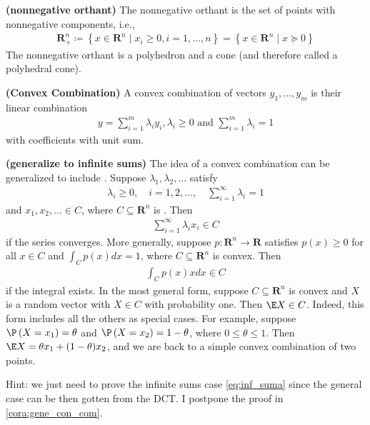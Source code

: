\documentclass{article}
\newcommand{\bfs}[1]{\textbf{({#1}) }}
\begin{document}
\begin{exma}{\bfs{nonnegative orthant}}\label{exma:orthnat}
The nonnegative orthant is the set of points with nonnegative components, i.e.,
\begin{align*}
\mathbf{R}_{+}^{n}\coloneqq\left\{x \in \mathbf{R}^{n} \mid x_{i} \geq 0, i=1, \ldots, n\right\}=\left\{x \in \mathbf{R}^{n} \mid x \succeq 0\right\}
\end{align*}
The nonnegative orthant is a polyhedron and a cone (and therefore called a polyhedral cone).
\end{exma}

\begin{defa}{\bfs{Convex Combination}}\label{def:con_com}
 A convex combination of  vectors $y_{1}, \ldots, y_{m}$ is their linear combination
\begin{align*}
y=\sum_{i=1}^{m} \lambda_{i} y_{i}, \lambda_{i} \geq 0 \text{ and } \sum_{i=1}^{m} \lambda_{i}=1
\end{align*}
with  coefficients with unit sum.
\end{defa}
\begin{rema}{\bfs{generalize to infinite sums}}\label{rema:gene_con_com}
The idea of a convex combination can be generalized to include . Suppose $\lambda_{1}, \lambda_{2}, \ldots$ satisfy
\begin{align*}
\lambda_{i} \geq 0, \quad i=1,2, \ldots, \quad \sum_{i=1}^{\infty} \lambda_{i}=1
\end{align*}
and $x_{1}, x_{2}, \ldots \in C$, where $C \subseteq \mathbf{R}^{n}$ is . Then
\begin{align}
\sum_{i=1}^{\infty} \lambda_{i} x_{i} \in C \label{eq:inf_suma}
\end{align}
if the series converges. More generally, suppose $p: \mathbf{R}^{n} \rightarrow \mathbf{R}$ satisfies $p(x) \geq 0$ for all $x \in C$ and $\int_{C} p(x) d x=1$, where $C \subseteq \mathbf{R}^{n}$ is convex. Then
\begin{align*}
\int_{C} p(x) x d x \in C
\end{align*}
if the integral exists. In the most general form, suppose $C \subseteq \mathbf{R}^{n}$ is convex and $X$ is a random vector with $X \in C$ with probability one. Then $\E X \in C$. Indeed, this form includes all the others as special cases. For example, suppose  $\P\left(X=x_{1}\right)=\theta$ and $\P\left(X=x_{2}\right)=1-\theta$, where $0 \leq \theta \leq 1$. Then $\E X=\theta x_{1}+(1-\theta) x_{2}$, and we are back to a simple convex combination of two points.

Hint: we just need to prove the infinite sums case \cref{eq:inf_suma} since the general case can be then gotten from the DCT. I postpone the proof in \cref{cora:gene_con_com}.
\end{rema}
\end{document}
